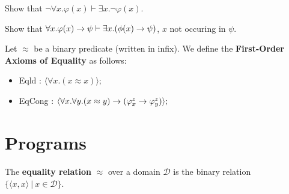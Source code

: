 \documentclass[english, 11pt]{article}
\begin{document}
    \begin{exmp}
      Show that $\neg \forall x. \varphi (x) \vdash \exists x. \neg \varphi(x)$.
      \begin{flagderiv}
      \end{flagderiv}
    \end{exmp}

    \begin{exmp}
      Show that $\forall x. \varphi(x) \rightarrow \psi \vdash \exists x. (\phi(x) \rightarrow \psi)$, $x$ not occuring in $\psi$.
      \begin{flagderiv}

      \end{flagderiv}
    \end{exmp}


    \begin{defn}\label{First-Order Axioms of Equality}
    Let $\approx$ be a binary predicate (written in infix). We define the \textbf{First-Order Axioms of Equality} as follows:
    \begin{itemize}
      \item Eqld : $\langle \forall x. (x \approx x)\rangle ;$
      \item EqCong : $\langle \forall x. \forall y. (x \approx y) \rightarrow (\varphi_x^z \rightarrow \varphi_y^z)\rangle;$
    \end{itemize}
    \end{defn}

    \section{Programs}

    \begin{defn}\label{equality relation}
    The \textbf{equality relation} $\approx$ over a domain $\mathcal{D}$ is the binary relation $\{\langle x, x \rangle \ | \ x \in \mathcal{D}\}$.
    \end{defn}
\end{document}
